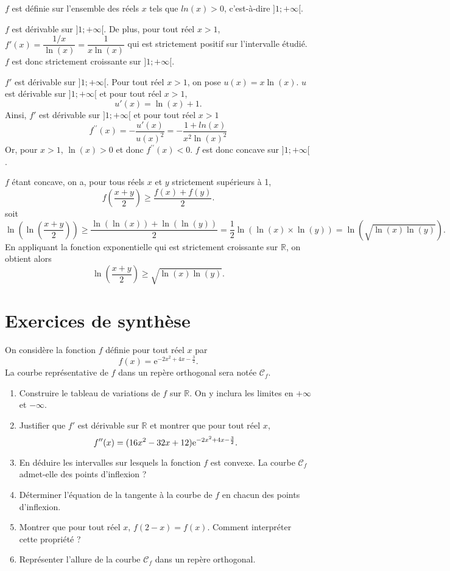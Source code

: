 \documentclass[11pt,fleqn, openany]{book} %
\begin{document}
\begin{solution}
\(f\) est définie sur l'ensemble des réels \(x\) tels que \(ln(x)>0\), c'est-à-dire \(]1;+\infty[\).

\(f\) est dérivable sur  \(]1;+\infty[\). De plus, pour tout réel \(x>1\), \(f'(x)=\dfrac{1/x}{\ln(x)}=\dfrac{1}{x\ln(x)}\) qui est strictement positif sur l'intervalle étudié. \(f\) est donc strictement croissante sur \(]1;+\infty[\).

\(f'\) est dérivable sur \(]1;+\infty[\). Pour tout réel \(x>1\), on pose \(u(x)=x\ln(x)\). \(u\) est dérivable sur \(]1;+\infty[\) et pour tout réel \(x>1\),
\[u'(x)=\ln(x)+1.\]
Ainsi, \(f'\) est dérivable sur \(]1;+\infty[\) et pour tout réel \(x>1\)
\[f^{\prime\prime}(x)= -\dfrac{u'(x)}{u(x)^2}=-\dfrac{1+ln(x)}{x^2\ln(x)^2}\]
Or, pour \(x>1\), \(\ln(x)>0\) et donc \(f^{\prime\prime}(x)<0\).  \(f\) est donc concave sur \(]1;+\infty[\).

\(f\) étant concave, on a, pour tous réels \(x\) et \(y\) strictement supérieurs à 1,
\[f\left(\dfrac{x+y}{2}\right) \geqslant \dfrac{f(x)+f(y)}{2}.\] 
soit
\[\ln\left(\ln\left(\dfrac{x+y}{2}\right)\right) \geqslant \dfrac{\ln(\ln(x))+\ln(\ln(y))}{2}=\dfrac{1}{2}\ln\left( \ln(x) \times \ln(y)\right)=\ln\left(\sqrt{\ln(x)\ln(y)}\right) .\] 
En appliquant la fonction exponentielle qui est strictement croissante sur \(\mathbb{R}\), on obtient alors
\[ \ln \left( \dfrac{x+y}{2}\right) \geqslant \sqrt{\ln(x)\ln(y)} .\]\end{solution}




\section*{Exercices de synthèse}



\begin{exercise}[topic=cvx04]
On considère la fonction $f$ définie pour tout réel $x$ par
\[ f(x)=\mathrm{e}^{-2x^2+4x-\frac{3}{2}}.\]
La courbe représentative de $f$ dans un repère orthogonal sera notée $\mathcal{C}_f$.
\vskip5pt
\begin{enumerate}
\item Construire le tableau de variations de $f$ sur $\mathbb{R}$. On y inclura les limites en $+\infty$ et $-\infty$.

\item Justifier que $f'$ est dérivable sur $\mathbb{R}$ et montrer que pour tout réel $x$, 
\[ f''(x)=(16x^2-32x+12)\mathrm{e}^{-2x^2+4x-\frac{3}{2}}.\]
\item En déduire les intervalles sur lesquels la fonction $f$ est convexe. La courbe $\mathcal{C}_f$ admet-elle des points d'inflexion ?
\item Déterminer l'équation de la tangente à la courbe de $f$ en chacun des points d'inflexion.
\item Montrer que pour tout réel $x$, $f(2-x)=f(x)$. Comment interpréter cette propriété ?
\item Représenter l'allure de la courbe $\mathcal{C}_f$ dans un repère orthogonal.\end{enumerate}\end{exercise}
\end{document}
